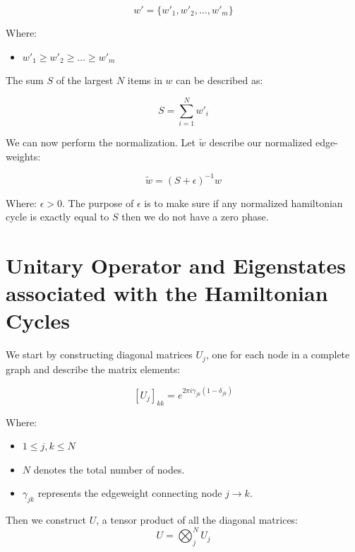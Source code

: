 \documentclass[msc,oneside]{ubcthesis}
\begin{document}
	\begin{equation}\label{sorted-weights}
	w' = \{w'_1, w'_2, \ldots, w'_m\}
	\end{equation}
	
	Where: \begin{itemize}
		\item[] $w'_1 \geq w'_2 \geq \ldots \geq w'_m$
		\end{itemize}
		
The sum $S$ of the largest $N$ items in $w$ can be described as:

\begin{equation}\label{sum-S}
S = \sum_{i=1}^{N} w'_i
\end{equation}

  We can now perform the normalization. Let $\tilde{w}$ describe our normalized edge-weights:
  
 \begin{equation}\label{normalization}
  	\tilde{w} = (S + \epsilon)^{-1}w
\end{equation}

		Where: $\epsilon>0$.  The purpose of $\epsilon$ is to make sure if any normalized hamiltonian cycle is exactly equal to $ S$ then we do not have a zero phase.
	
	
	\section{Unitary Operator and Eigenstates associated with the Hamiltonian Cycles}
	
	 We start by constructing diagonal matrices $U_j$, one for each node in a complete graph and describe the matrix elements:
	
	\begin{equation}\label{Uj-elements}
	\left[U_j \right]_{kk} = e^{2\pi i\gamma_{jk} (1 - \delta_{jk})}
	\end{equation}
	
	Where:	\begin{itemize}
		\item[]  $ 1 \leq j, k \leq N$
		\item[]  $N$ denotes the total number of nodes.
		\item[]  $\gamma_{jk}$ represents the edgeweight connecting node $j\rightarrow k$.
	\end{itemize}
	
	
	Then we construct $U$, a tensor product of all the diagonal matrices:
	\begin{equation}\label{U-tensor}
	 U = \bigotimes_j^N U_j
	 \end{equation}
	
\end{document}

